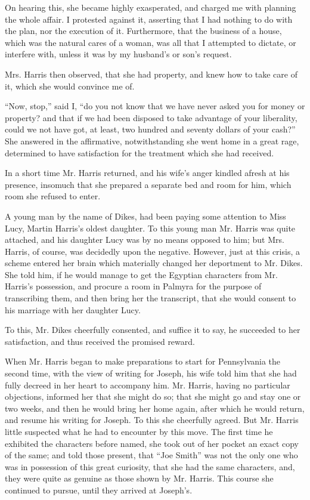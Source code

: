 		On hearing this, she became highly exasperated, and charged me with planning the whole affair. I protested against it, asserting that I had nothing to do with the plan, nor the execution of it. Furthermore, that the business of a house, which was the natural cares of a woman, was all that I attempted to dictate, or interfere with, unless it was by my husband's or son's request.

		Mrs. Harris then observed, that she had property, and knew how to take care of it, which she would convince me of.

		``Now, stop,'' said I, ``do you not know that we have never asked you for money or property? and that if we had been disposed to take advantage of your liberality, could we not have got, at least, two hundred and seventy dollars of your cash?'' She answered in the affirmative, notwithstanding she went home in a great rage, determined to have satisfaction for the treatment which she had received.

		In a short time Mr. Harris returned, and his wife's anger kindled afresh at his presence, insomuch that she prepared a separate bed and room for him, which room she refused to enter.

		A young man by the name of Dikes, had been paying some attention to Miss Lucy, Martin Harris's oldest daughter. To this young man Mr. Harris was quite attached, and his daughter Lucy was by no means opposed to him; but Mrs. Harris, of course, was decidedly upon the negative. However, just at this crisis, a scheme entered her brain which materially changed her deportment to Mr. Dikes. She told him, if he would manage to get the Egyptian characters from Mr. Harris's possession, and procure a room in Palmyra for the purpose of transcribing them, and then bring her the transcript, that she would consent to his marriage with her daughter Lucy.

		To this, Mr. Dikes cheerfully consented, and suffice it to say, he succeeded to her satisfaction, and thus received the promised reward.

		When Mr. Harris began to make preparations to start for Pennsylvania the second time, with the view of writing for Joseph, his wife told him that she had fully decreed in her heart to accompany him. Mr. Harris, having no particular objections, informed her that she might do so; that she might go and stay one or two weeks, and then he would bring her home again, after which he would return, and resume his writing for Joseph. To this she cheerfully agreed. But Mr. Harris little suspected what he had to encounter by this move. The first time he exhibited the characters before named, she took out of her pocket an exact copy of the same; and told those present, that ``Joe Smith'' was not the only one who was in possession of this great curiosity, that she had the same characters, and, they were quite as genuine as those shown by Mr. Harris. This course she continued to pursue, until they arrived at Joseph's.

